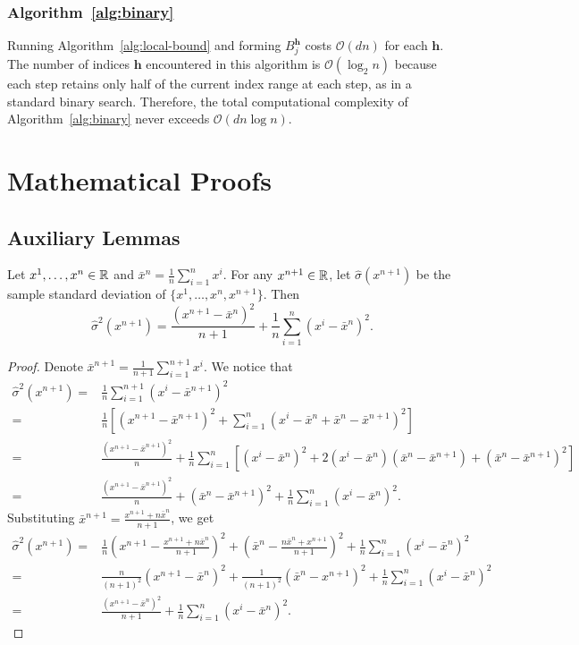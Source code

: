\subsubsection{Algorithm~\ref{alg:binary}} \label{app:backward-binary}
Running Algorithm~\ref{alg:local-bound} and forming $B^{\mathbf{h}}_j$ costs $\mathcal{O}(dn)$ for each $\mathbf{h}$. The number of indices $\mathbf{h}$ encountered in this algorithm is $\mathcal{O}(\log_2{n})$ because each step retains only half of the current index range at each step, as in a standard binary search. Therefore, the total computational complexity of Algorithm~\ref{alg:binary} never exceeds $\mathcal{O}(dn\log{n})$.

\clearpage

\section{Mathematical Proofs} 
\label{app:proofs}

\subsection{Auxiliary Lemmas}\label{app:proofs-lemmas}

\begin{lemma}\label{lem:1}
    Let $x^1,\ldots,x^n \in \mathbb{R}$ and $\bar{x}^n = \frac{1}{n}\sum^n_{i=1}x^i$. For any $x^{n+1}\in \mathbb{R}$, let $\hat\sigma(x^{n+1})$ be the sample standard deviation of $\{x^1,\ldots,x^n, x^{n+1}\}$. Then
    \[
    \hat\sigma^2(x^{n+1}) = \frac{(x^{n+1}-\bar{x}^{n})^2}{n+1}+\frac{1}{n}\sum^n_{i=1}(x^i-\bar{x}^{n})^2.
    \]
\end{lemma}
\begin{proof}
    Denote $\bar{x}^{n+1} = \frac{1}{n+1}\sum^{n+1}_{i=1}x^i$. We notice that
\begin{align*}
    \hat\sigma^2(x^{n+1}) = &\frac{1}{n}\sum^{n+1}_{i=1}(x^i-\bar{x}^{n+1})^2\\
    = &\frac{1}{n} \left[ (x^{n+1}-\bar{x}^{n+1})^2+\sum^n_{i=1}(x^i-\bar{x}^{n}+\bar{x}^{n}-\bar{x}^{n+1})^2 \right]\\
    = &\frac{(x^{n+1}-\bar{x}^{n+1})^2}{n}+\frac{1}{n}\sum^n_{i=1}\left[(x^i-\bar{x}^{n})^2+2(x^i-\bar{x}^n)(\bar{x}^n-\bar{x}^{n+1})+(\bar{x}^{n}-\bar{x}^{n+1})^2\right]\\
    = &\frac{(x^{n+1}-\bar{x}^{n+1})^2}{n}+(\bar{x}^{n}-\bar{x}^{n+1})^2+\frac{1}{n}\sum^n_{i=1}(x^i-\bar{x}^{n})^2.
\end{align*}
Substituting $\bar{x}^{n+1} = \frac{x^{n+1}+n\bar{x}^n}{n+1}$, we get
\begin{align*}    
    \hat\sigma^2(x^{n+1}) = &\frac{1}{n}\left(x^{n+1}-\frac{x^{n+1}+n\bar{x}^n}{n+1}\right)^2+\left(\bar{x}^n-\frac{n\bar{x}^n+x^{n+1}}{n+1}\right)^2+\frac{1}{n}\sum^n_{i=1}(x^i-\bar{x}^{n})^2\\
    = &\frac{n}{(n+1)^2}(x^{n+1}-\bar{x}^n)^2+\frac{1}{(n+1)^2}(\bar{x}^n-x^{n+1})^2+\frac{1}{n}\sum^n_{i=1}(x^i-\bar{x}^{n})^2\\
    = &\frac{(x^{n+1}-\bar{x}^{n})^2}{n+1}+\frac{1}{n}\sum^n_{i=1}(x^i-\bar{x}^{n})^2.
\end{align*}
\end{proof}

